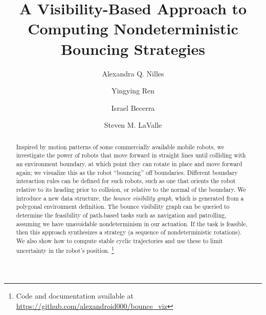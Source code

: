 \documentclass[]{styles/svproc}  %
\begin{document}
\mainmatter              %


\title{A Visibility-Based Approach to Computing Nondeterministic Bouncing
Strategies}

\author{Alexandra Q. Nilles \and Yingying Ren \and Israel
Becerra \and Steven M. LaValle%
}


\maketitle

\begin{abstract}
Inspired by motion patterns of some commercially available mobile robots, we
investigate the power of robots that move forward in straight lines until
colliding with an environment boundary, at which point they can rotate in place
and move forward again; we visualize this as the robot ``bouncing'' off
boundaries. Different boundary interaction rules can be defined for such robots,
such as one that orients the robot relative to its heading prior to collision,
or relative to the normal of the boundary. We introduce a new data structure,
the {\em bounce visibility graph}, which is generated from a polygonal
environment definition. The bounce visibility graph can be queried to determine
the feasibility of path-based tasks such as navigation and patrolling, assuming
we have unavoidable nondeterminism in our actuation. If the task is feasible, 
then this approach synthesizes a strategy (a sequence of nondeterministic rotations). We also show how to compute
stable cyclic trajectories and use these to limit uncertainty in the robot's
position.
\footnote{Code and documentation available at
\url{https://github.com/alexandroid000/bounce_viz}}
\end{abstract}
\end{document}
